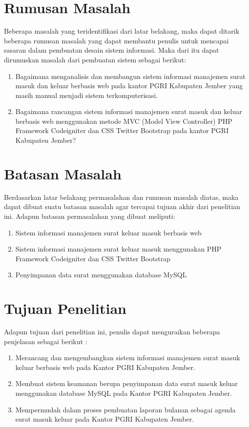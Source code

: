 \documentclass{jtetiproposalskripsi}
\begin{document}
\section{Rumusan Masalah}
Beberapa masalah yang teridentifikasi dari latar belakang, maka dapat ditarik beberapa rumusan masalah yang dapat membantu penulis untuk mencapai sasaran dalam pembuatan desain sistem informasi. Maka dari itu dapat dirumuskan masalah dari pembuatan sistem sebagai berikut:
\begin{enumerate}
\item Bagaimana menganalisis dan membangun  sistem informasi manajemen surat masuk dan keluar berbasis web pada kantor PGRI Kabupaten Jember yang masih manual menjadi sistem terkomputerisasi.
\item Bagaimana rancangan sistem informasi manajemen surat masuk dan keluar berbasis web menggunakan metode MVC (Model View Controller) PHP Framework Codeigniter dan CSS Twitter Bootstrap pada kantor PGRI Kabupaten Jember?
\end{enumerate}

\section{Batasan Masalah}
Berdasarkan latar belakang permasalahan dan rumusan masalah diatas, maka dapat dibuat suatu batasan masalah agar tercapai tujuan akhir dari penelitian ini. Adapun batasan permasalahan yang dibuat meliputi:
\begin{enumerate}
\item Sistem informasi manajemen surat keluar masuk berbasis web
\item Sistem informasi manajemen surat keluar masuk menggunakan PHP Framework Codeigniter dan CSS Twitter Bootstrap
\item Penyimpanan data surat menggunakan database MySQL
\end{enumerate}

\section{Tujuan Penelitian}
Adapun tujuan dari penelitian ini, penulis dapat menguraikan beberapa penjelasan sebagai berikut :
\begin{enumerate}
\item Merancang dan mengembangkan sistem informasi manajemen surat masuk keluar berbasis web pada Kantor PGRI Kabupaten Jember.
\item Membuat sistem keamanan berupa penyimpanan data surat masuk keluar menggunakan database MySQL pada Kantor PGRI Kabupaten Jember.
\item Mempermudah dalam proses pembuatan laporan bulanan sebagai agenda surat masuk keluar pada Kantor PGRI Kabupaten Jember.
\end{enumerate}
\end{document}
